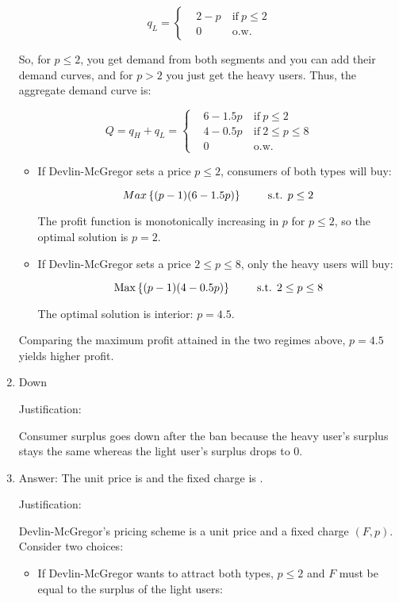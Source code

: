 \documentclass{article}
\DeclareMathOperator*{\Max}{Max}
\newcommand{\st}{\hbox{ s.t. }}
\newenvironment{solution}{\color{red}}{\color{black}}
\begin{document}
\begin{solution}
\begin{enumerate}
\[ q_L=\left\{\begin{aligned}
& 2-p\  & \text{if}\ p\leq 2\\
& 0\ & \text{o.w.}
\end{aligned}\right. \]

So, for $p \leq 2$, you get demand from both segments and you can add their demand curves, and for $p > 2$ you just get the heavy users. Thus, the aggregate demand curve is:

\[ Q=q_H+q_L=\left\{
\begin{aligned}
& 6-1.5p\  & \text{if}\ p\leq 2\\
& 4-0.5p\  & \text{if}\ 2\leq p\leq 8\\
& 0 & \text{o.w.}
\end{aligned}\right. \]

\begin{itemize}
\item If Devlin-McGregor sets a price $p\leq 2$, consumers of both types will buy:

\[ Max \left\{ (p-1)(6-1.5p) \right\}  \qquad \st  p\leq2 \]

The profit function is monotonically increasing in $p$ for $p \leq 2$, so the optimal solution is $p=2$.

\item If Devlin-McGregor sets a price $2\leq p\leq 8$, only the heavy users will buy:

\[ \Max \left\{ (p-1)(4-0.5p) \right\} \qquad \st 2\leq p\leq8 \]

The optimal solution is interior: $p=4.5$.
\end{itemize}
Comparing the maximum profit attained in the two regimes above, $p=4.5$ yields higher profit. 

\item Down

Justification:

Consumer surplus goes down after the ban because the heavy user's surplus stays the same whereas the light user's surplus drops to 0.

\item  Answer: The unit price is  and the fixed charge is .

Justification:

Devlin-McGregor's pricing scheme is a unit price and a fixed charge $(F,p)$. Consider two choices:

\begin{itemize}
\item If Devlin-McGregor wants to attract both types, $p\leq 2$ and $F$ must be equal to the surplus of the light users:


\end{itemize}
\end{enumerate}
\end{solution}
\end{document}
